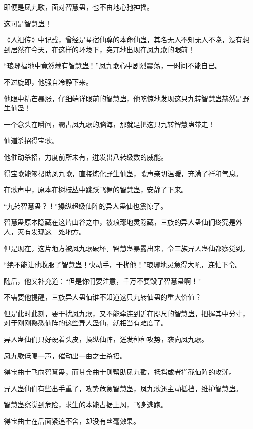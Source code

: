 
\begin{this_body}

即便是凤九歌，面对智慧蛊，也不由地心驰神摇。

这可是智慧蛊！

《人祖传》中记载，曾经是星宿仙尊的本命仙蛊，其名无人不知无人不晓，没有想到居然在今天，在这样的环境下，突兀地出现在凤九歌的眼前！

“琅琊福地中竟然藏有智慧蛊！”凤九歌心中剧烈震荡，一时间不能自已。

不过旋即，他强自冷静下来。

他眼中精芒暴涨，仔细端详眼前的智慧蛊，他吃惊地发现这只九转智慧蛊赫然是野生仙蛊！

一个念头在瞬间，霸占凤九歌的脑海，那就是把这只九转智慧蛊带走！

仙道杀招得宝歌。

他催动杀招，力度前所未有，迸发出八转级数的威能。

得宝歌能够帮助凤九歌，直接炼化野生仙蛊，歌声亲切温暖，充满了祥和气息。

在歌声中，原本在树枝丛中跳跃飞舞的智慧蛊，安静了下来。

“九转智慧蛊？！”操纵超级仙阵的异人蛊仙也震惊了。

智慧蛊原本隐藏在这片山谷之中，被琅琊地灵隐藏，三族的异人蛊仙们终究是外人，灭有发现这一处地方。

但是现在，这片地方被凤九歌破坏，智慧蛊暴露出来，令三族异人蛊仙都察觉到。

“绝不能让他收服了智慧蛊！快动手，干扰他！”琅琊地灵急得大吼，连忙下令。

随后，他又补充道：“但是你们要注意，千万不要毁了智慧蛊啊！”

不需要他提醒，三族异人蛊仙谁不知道这只九转仙蛊的重大价值？

但是此时此刻，要干扰凤九歌，又不能牵连到近在咫尺的智慧蛊，把握其中分寸，对于刚刚熟悉仙阵的这些异人蛊仙，就相当有难度了。

异人蛊仙们只好硬着头皮，操纵仙阵，迸发种种攻势，袭向凤九歌。

凤九歌低喝一声，催动出一曲之士杀招。

得宝曲士飞向智慧蛊，而其余曲士则帮助凤九歌，抵挡或者拦截仙阵的攻潮。

异人蛊仙们有些出手重了，攻势危急智慧蛊，凤九歌还主动抵挡，维护智慧蛊。

智慧蛊察觉到危险，求生的本能占据上风，飞身逃跑。

得宝曲士在后面紧追不舍，却没有丝毫效果。


\end{this_body}
